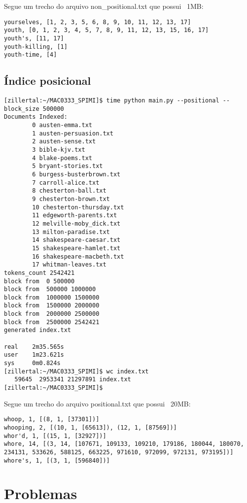\documentclass[a4paper]{article}
\begin{document}
Segue um trecho do arquivo non_positional.txt que possui ~1MB:

\begin{verbatim}
yourselves, [1, 2, 3, 5, 6, 8, 9, 10, 11, 12, 13, 17]
youth, [0, 1, 2, 3, 4, 5, 7, 8, 9, 11, 12, 13, 15, 16, 17]
youth's, [11, 17]
youth-killing, [1]
youth-time, [4]
\end{verbatim}


\subsection{Índice posicional}

\begin{verbatim}
[zillertal:~/MAC0333_SPIMI]$ time python main.py --positional --block_size 500000
Documents Indexed:
        0 austen-emma.txt
        1 austen-persuasion.txt
        2 austen-sense.txt
        3 bible-kjv.txt
        4 blake-poems.txt
        5 bryant-stories.txt
        6 burgess-busterbrown.txt
        7 carroll-alice.txt
        8 chesterton-ball.txt
        9 chesterton-brown.txt
        10 chesterton-thursday.txt
        11 edgeworth-parents.txt
        12 melville-moby_dick.txt
        13 milton-paradise.txt
        14 shakespeare-caesar.txt
        15 shakespeare-hamlet.txt
        16 shakespeare-macbeth.txt
        17 whitman-leaves.txt
tokens_count 2542421
block from  0 500000
block from  500000 1000000
block from  1000000 1500000
block from  1500000 2000000
block from  2000000 2500000
block from  2500000 2542421
generated index.txt

real    2m35.565s
user    1m23.621s
sys     0m0.824s
[zillertal:~/MAC0333_SPIMI]$ wc index.txt
   59645  2953341 21297891 index.txt
[zillertal:~/MAC0333_SPIMI]$
\end{verbatim}

Segue um trecho do arquivo positional.txt que possui ~20MB:

\begin{verbatim}
whoop, 1, [(8, 1, [37301])]
whooping, 2, [(10, 1, [65613]), (12, 1, [87569])]
whor'd, 1, [(15, 1, [32927])]
whore, 14, [(3, 14, [107671, 109133, 109210, 179186, 180044, 180070, 234131, 533626, 588125, 663225, 971610, 972099, 972131, 973195])]
whore's, 1, [(3, 1, [596840])]
\end{verbatim}

\section{Problemas}
\end{document}
